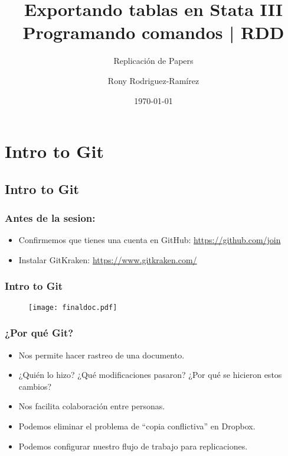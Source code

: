 \documentclass[10pt, aspectratio=169, compress]{beamer}
\title{Exportando tablas en Stata III \\ Programando comandos | RDD}
\subtitle{Replicación de Papers}
\author{Rony Rodriguez-Ramírez}
\institute{LAMBDA}
\date{\today}
\begin{document}
\begin{frame}[plain]
	\maketitle 
\end{frame}
\section{Intro to Git}
\subsection{Intro to Git}
\begin{frame}
	\frametitle{Antes de la sesion:}

	\begin{itemize}
		\item Confirmemos que tienes una cuenta en GitHub: \hyperlink{https://github.com/join}{https://github.com/join}
		\item Instalar GitKraken: \hyperlink{https://www.gitkraken.com/}{https://www.gitkraken.com/}
	\end{itemize}
\end{frame}
\begin{frame}
	\frametitle{Intro to Git}	
	\begin{figure}[H]
		\centering
		\texttt{[image: finaldoc.pdf]}
	\end{figure}
\end{frame}
\begin{frame}
	\frametitle{¿Por qué Git?}

	\begin{itemize}
		\item Nos permite hacer rastreo de una documento. 
		\item ¿Quién lo hizo? ¿Qué modificaciones pasaron? ¿Por qué se hicieron estos cambios?
		\item Nos facilita colaboración entre personas.
		\item Podemos eliminar el problema de ``copia conflictiva'' en Dropbox. 
		\item Podemos configurar nuestro flujo de trabajo para replicaciones.
	\end{itemize}
\end{frame}
\end{document}
